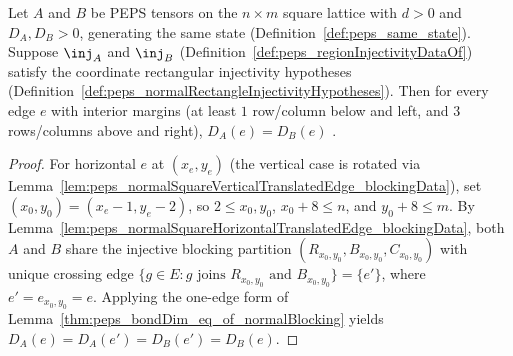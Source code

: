 \begin{lemma}%
    \label{thm:peps_bondDim_interiorEdge_eq_of_normalSquareRectangularInjectivity}
    \leanok
    Let $A$ and $B$ be PEPS tensors on the $n\times m$ square lattice with
    $d>0$ and $D_A,D_B>0$, generating the same state
    (Definition~\ref{def:peps_same_state}). Suppose $\inj_A$ and $\inj_B$
    (Definition~\ref{def:peps_regionInjectivityDataOf}) satisfy the coordinate
    rectangular injectivity hypotheses
    (Definition~\ref{def:peps_normalRectangleInjectivityHypotheses}). Then for
    every edge $e$ with interior margins (at least $1$ row/column below and
    left, and $3$ rows/columns above and right), $D_A(e)=D_B(e)$
    \cite[Section~3, Lemma \emph{inj\_isomorph}, lines~560--583 and
        1407--1500]{Molnar2018NormalPEPS}.
    \begin{proof}
        \leanok
        For horizontal $e$ at $(x_e,y_e)$ (the vertical case is rotated via
        Lemma~\ref{lem:peps_normalSquareVerticalTranslatedEdge_blockingData}),
        set $(x_0,y_0)=(x_e-1,y_e-2)$, so $2\le x_0,y_0$, $x_0+8\le n$, and
        $y_0+8\le m$. By
        Lemma~\ref{lem:peps_normalSquareHorizontalTranslatedEdge_blockingData},
        both $A$ and $B$ share the injective blocking partition
        $(R_{x_0,y_0},B_{x_0,y_0},C_{x_0,y_0})$ with unique crossing edge
        $\{g\in E:g\text{ joins }R_{x_0,y_0}\text{ and }B_{x_0,y_0}\}=\{e'\}$,
        where $e'=e_{x_0,y_0}=e$. Applying the one-edge form of
        Lemma~\ref{thm:peps_bondDim_eq_of_normalBlocking} yields
        $D_A(e)=D_A(e')=D_B(e')=D_B(e)$.
    \end{proof}
\end{lemma}
